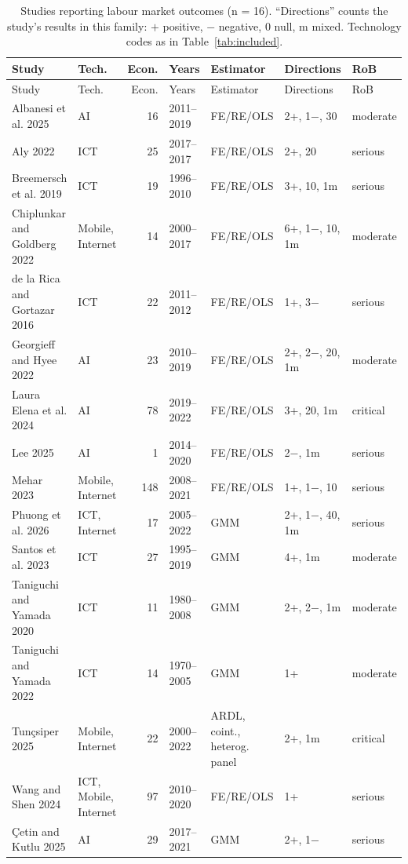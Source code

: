 {\scriptsize\setlength{\tabcolsep}{3pt}
\begin{longtable}{@{}p{3.1cm} p{1.9cm} r l p{2.4cm} p{2.3cm} l@{}}
\caption{Studies reporting labour market outcomes (n = 16). ``Directions'' counts the study's results in this family: $+$ positive, $-$ negative, 0 null, m mixed. Technology codes as in Table~\ref{tab:included}.}\label{tab:fam3}\\
\toprule Study & Tech. & Econ. & Years & Estimator & Directions & RoB \\ \midrule \endfirsthead
\toprule Study & Tech. & Econ. & Years & Estimator & Directions & RoB \\ \midrule \endhead
\bottomrule \endfoot
Albanesi et al. 2025 & AI & 16 & 2011--2019 & FE/RE/OLS & 2+, 1$-$, 30 & moderate \\
Aly 2022 & ICT & 25 & 2017--2017 & FE/RE/OLS & 2+, 20 & serious \\
Breemersch et al. 2019 & ICT & 19 & 1996--2010 & FE/RE/OLS & 3+, 10, 1m & serious \\
Chiplunkar and Goldberg 2022 & Mobile, Internet & 14 & 2000--2017 & FE/RE/OLS & 6+, 1$-$, 10, 1m & moderate \\
de la Rica and Gortazar 2016 & ICT & 22 & 2011--2012 & FE/RE/OLS & 1+, 3$-$ & serious \\
Georgieff and Hyee 2022 & AI & 23 & 2010--2019 & FE/RE/OLS & 2+, 2$-$, 20, 1m & moderate \\
Laura Elena et al. 2024 & AI & 78 & 2019--2022 & FE/RE/OLS & 3+, 20, 1m & critical \\
Lee 2025 & AI & 1 & 2014--2020 & FE/RE/OLS & 2$-$, 1m & serious \\
Mehar 2023 & Mobile, Internet & 148 & 2008--2021 & FE/RE/OLS & 1+, 1$-$, 10 & serious \\
Phuong et al. 2026 & ICT, Internet & 17 & 2005--2022 & GMM & 2+, 1$-$, 40, 1m & serious \\
Santos et al. 2023 & ICT & 27 & 1995--2019 & GMM & 4+, 1m & moderate \\
Taniguchi and Yamada 2020 & ICT & 11 & 1980--2008 & GMM & 2+, 2$-$, 1m & moderate \\
Taniguchi and Yamada 2022 & ICT & 14 & 1970--2005 & GMM & 1+ & moderate \\
Tunçsiper 2025 & Mobile, Internet & 22 & 2000--2022 & ARDL, coint., heterog. panel & 2+, 1m & critical \\
Wang and Shen 2024 & ICT, Mobile, Internet & 97 & 2010--2020 & FE/RE/OLS & 1+ & serious \\
Çetin and Kutlu 2025 & AI & 29 & 2017--2021 & GMM & 2+, 1$-$ & serious \\
\end{longtable}
}

